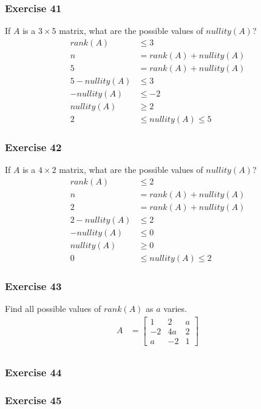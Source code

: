 \documentclass[letterpaper, 12pt]{math}
\begin{document}
\subsubsection*{Exercise 41}
If \( A \) is a \( 3\times5 \) matrix, what are the possible values of
\( nullity(A) \)?
\begin{align*}
  rank(A) &\le 3 \\
  n &= rank(A)+nullity(A) \\
  5 &= rank(A)+nullity(A) \\
  5-nullity(A) &\le 3 \\
  -nullity(A) &\le -2 \\
  nullity(A) &\ge 2 \\
  2 &\le nullity(A) \le 5
\end{align*}

\subsubsection*{Exercise 42}
If \( A \) is a \( 4\times2 \) matrix, what are the possible values of
\( nullity(A) \)?
\begin{align*}
  rank(A) &\le 2 \\
  n &= rank(A)+nullity(A) \\
  2 &= rank(A)+nullity(A) \\
  2-nullity(A) &\le 2 \\
  -nullity(A) &\le 0 \\
  nullity(A) &\ge 0 \\
  0 &\le nullity(A) \le 2
\end{align*}

\subsubsection*{Exercise 43}
Find all possible values of \( rank(A) \) as \( a \) varies.
\begin{align*}
  A &= \begin{bmatrix}
    1 & 2 & a \\
    -2 & 4a & 2 \\
    a & -2 & 1
  \end{bmatrix} \\
\end{align*}


\subsubsection*{Exercise 44}
\subsubsection*{Exercise 45}
\end{document}

